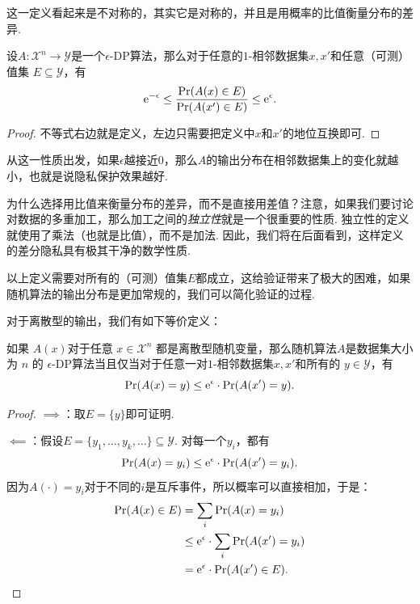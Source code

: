 这一定义看起来是不对称的，其实它是对称的，并且是用概率的比值衡量分布的差异. 

\begin{proposition}
    设$A:\mathcal X^n\to\mathcal Y$是一个$\epsilon$-DP算法，那么对于任意的$1$-相邻数据集$x, x'$和任意（可测）值集 $E \subseteq \mathcal Y$，有
    \[
    \mathrm{e}^{-\epsilon}\leq \frac{\Pr(A(x)\in E)}{\Pr(A(x')\in E)}\leq \mathrm{e}^{\epsilon}.
    \]
\end{proposition}
\begin{proof}
    不等式右边就是定义，左边只需要把定义中$x$和$x'$的地位互换即可.
\end{proof}

从这一性质出发，如果$\epsilon$越接近$0$，那么$A$的输出分布在相邻数据集上的变化就越小，也就是说隐私保护效果越好.

\begin{remark}
    为什么选择用比值来衡量分布的差异，而不是直接用差值？注意，如果我们要讨论对数据的多重加工，那么加工之间的\textit{独立性}就是一个很重要的性质. 独立性的定义就使用了乘法（也就是比值），而不是加法. 因此，我们将在后面看到，这样定义的差分隐私具有极其干净的数学性质. 
\end{remark}

以上定义需要对所有的（可测）值集$E$都成立，这给验证带来了极大的困难，如果随机算法的输出分布是更加常规的，我们可以简化验证的过程. 

对于离散型的输出，我们有如下等价定义：
\begin{proposition}\label{proposition:discrete-dp}
    如果 $A(x)$对于任意 $x \in \mathcal X^n$ 都是离散型随机变量，那么随机算法$A$是数据集大小为 $n$ 的 $\epsilon$-DP算法当且仅当对于任意一对$1$-相邻数据集$x, x'$和所有的 $y \in \mathcal Y$，有
    \[
    \Pr(A(x) = y) \leq \mathrm{e}^{\epsilon} \cdot \Pr(A(x') = y).
    \]
\end{proposition}
\begin{proof}
$\implies$：取$E = \{y\}$即可证明.

$\impliedby$：假设$E=\{y_1,\dots,y_k,\dots\}\subseteq\mathcal Y$. 对每一个$y_i$，都有
    \[
    \Pr(A(x) = y_i) \leq \mathrm{e}^{\epsilon} \cdot \Pr(A(x') = y_i).
    \]
因为$A(\cdot)=y_i$对于不同的$i$是互斥事件，所以概率可以直接相加，于是：
    \begin{align*}
    \Pr(A(x) \in E) &= \sum_i \Pr(A(x) = y_i) \\
    &\leq \mathrm{e}^{\epsilon} \cdot \sum_i\Pr(A(x') = y_i) \\
    &= \mathrm{e}^{\epsilon} \cdot \Pr(A(x') \in E).
    \end{align*}
\end{proof}

